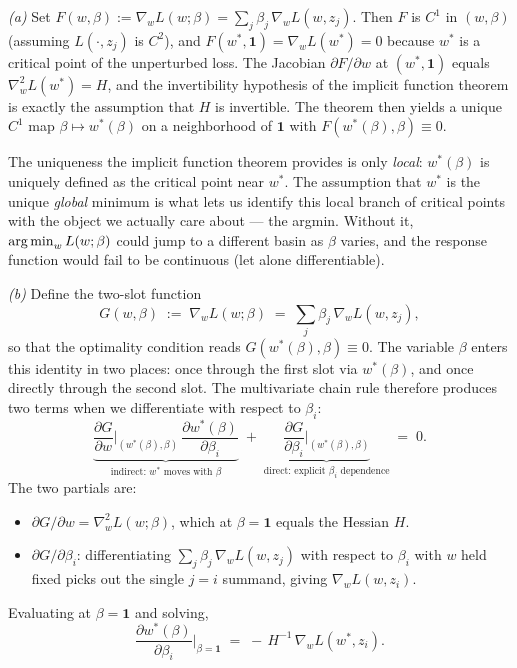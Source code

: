 \begin{solution}[ex:if-derive]

\textit{(a)} Set $F(w,\beta) := \nabla_w L(w;\beta) = \sum_j \beta_j\,\nabla_w L(w,z_j)$. Then $F$ is $C^1$ in $(w,\beta)$ (assuming $L(\cdot,z_j)$ is $C^2$), and $F(w^*,\mathbf{1}) = \nabla_w L(w^*) = 0$ because $w^*$ is a critical point of the unperturbed loss. The Jacobian $\partial F/\partial w$ at $(w^*,\mathbf{1})$ equals $\nabla_w^2 L(w^*) = H$, and the invertibility hypothesis of the implicit function theorem is exactly the assumption that $H$ is invertible. The theorem then yields a unique $C^1$ map $\beta\mapsto w^*(\beta)$ on a neighborhood of $\mathbf{1}$ with $F(w^*(\beta),\beta)\equiv 0$.

The uniqueness the implicit function theorem provides is only \emph{local}: $w^*(\beta)$ is uniquely defined as the critical point near $w^*$. The assumption that $w^*$ is the unique \emph{global} minimum is what lets us identify this local branch of critical points with the object we actually care about --- the argmin. Without it, $\operatorname*{arg\,min}_w L(w;\beta)$ could jump to a different basin as $\beta$ varies, and the response function would fail to be continuous (let alone differentiable).

\textit{(b)} Define the two-slot function
\[
  G(w,\beta) \;:=\; \nabla_w L(w;\beta) \;=\; \sum_{j} \beta_j\,\nabla_w L(w,z_j),
\]
so that the optimality condition reads $G(w^*(\beta),\beta) \equiv 0$. The variable $\beta$ enters this identity in two places: once through the first slot via $w^*(\beta)$, and once directly through the second slot. The multivariate chain rule therefore produces two terms when we differentiate with respect to $\beta_i$:
\[
  \underbrace{\frac{\partial G}{\partial w}\bigg|_{(w^*(\beta),\beta)}\,\frac{\partial w^*(\beta)}{\partial \beta_i}}_{\text{indirect: } w^* \text{ moves with } \beta} \;+\; \underbrace{\frac{\partial G}{\partial \beta_i}\bigg|_{(w^*(\beta),\beta)}}_{\text{direct: explicit } \beta_i \text{ dependence}} \;=\; 0.
\]
The two partials are:
\begin{itemize}
  \item $\partial G/\partial w = \nabla_w^2 L(w;\beta)$, which at $\beta = \mathbf{1}$ equals the Hessian $H$.
  \item $\partial G/\partial \beta_i$: differentiating $\sum_j \beta_j\,\nabla_w L(w,z_j)$ with respect to $\beta_i$ with $w$ held fixed picks out the single $j=i$ summand, giving $\nabla_w L(w,z_i)$.
\end{itemize}
Evaluating at $\beta = \mathbf{1}$ and solving,
\[
  \frac{\partial w^*(\beta)}{\partial \beta_i}\bigg\rvert_{\beta=\mathbf{1}} \;=\; -\,H^{-1}\,\nabla_w L(w^*,z_i).
\]


\end{solution}
